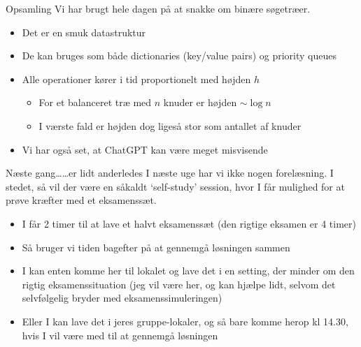 \documentclass[aspectratio=1610]{beamer}
\begin{document}
\begin{frame}{Opsamling}{}
    Vi har brugt hele dagen på at snakke om binære søgetræer.

    \begin{itemize}[<+(1)->]
        \item Det er en smuk datastruktur
        \item De kan bruges som både \alert{dictionaries} (key/value pairs) og
            priority queues
        \item Alle operationer kører i tid proportionelt med højden $h$
            \begin{itemize}
                \item For et balanceret træ med $n$ knuder er højden $\sim \log
                    n$
                \item I værste fald er højden dog ligeså stor som antallet af
                    knuder
            \end{itemize}
        \item Vi har også set, at ChatGPT kan være meget misvisende
    \end{itemize}
\end{frame}


\begin{frame}{Næste gang\ldots}{\ldots er lidt anderledes}
    I næste uge har vi ikke nogen forelæsning. I stedet, så vil der være en
    såkaldt `self-study' session, hvor I får mulighed for at prøve kræfter med
    et eksamenssæt.

    \begin{itemize}
        \item I får 2 timer til at lave et halvt eksamenssæt (den rigtige
            eksamen er 4 timer)
        \item Så bruger vi tiden bagefter på at gennemgå løsningen sammen
        \item I kan enten komme her til lokalet og lave det i en setting, der
            minder om den rigtig eksamenssituation (jeg vil være her, og kan
            hjælpe lidt, selvom det selvfølgelig bryder med
            eksamenssimuleringen)
        \item Eller I kan lave det i jeres gruppe-lokaler, og så bare komme
            herop kl 14.30, hvis I vil være med til at gennemgå løsningen
    \end{itemize}
\end{frame}
\end{document}
